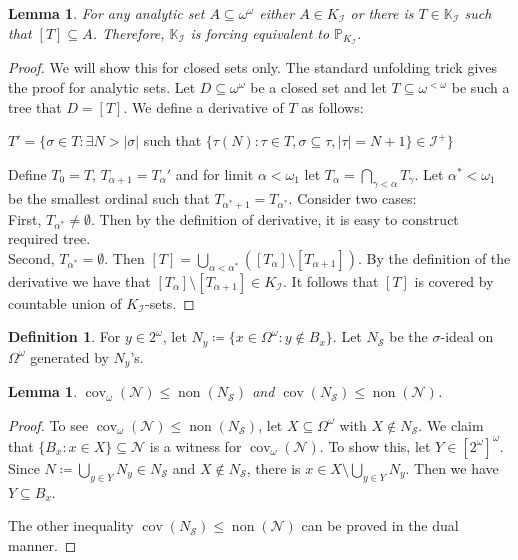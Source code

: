\documentclass[a4paper,12pt]{amsart}
\newtheorem{lem}[thm]{Lemma}
\theoremstyle{definition}
\newtheorem{dfn}[thm]{Definition}
\numberwithin{thm}{section}
\numberwithin{equation}{section}
\newcommand{\n}{\mathcal{N}}
\DeclareMathOperator{\non}{non}
\DeclareMathOperator{\cov}{cov}
\newcommand{\nonn}{\non(\mathcal{N})}
\newcommand{\I}{\mathscr{I}}
\newcommand{\covomn}{\operatorname{cov}_\omega(\mathcal{N})}
\newcommand{\Solecki}{\mathcal{S}}
\begin{document}
    \begin{lem}
        For any analytic set $A\subseteq\omega^{\omega}$ either $A\in K_{\mathscr{I}}$ or there is $T\in\mathbb{K}_{\I}$ such that $[T]\subseteq A$. Therefore, $\mathbb{K}_\I$ is forcing equivalent to $\mathbb{P}_{K_\I}$.
    \end{lem}
    \begin{proof}
        We will show this for closed sets only. The standard unfolding trick gives the proof for analytic sets. Let $D\subseteq\omega^{\omega}$ be a closed set and let $T\subseteq\omega^{<\omega}$ be such a tree that $D=[T]$. We define a derivative of $T$ as follows:
        \begin{center}
            $T'=\{\sigma\in T:\exists N>|\sigma|$ such that $\{\tau(N):\tau\in T, \sigma\subseteq\tau, |\tau|=N+1\}\in\I^{+}\}$
        \end{center}
        Define $T_{0}=T$, $T_{\alpha+1}=T_{\alpha}'$ and for limit $\alpha<\omega_{1}$ let $T_{\alpha}=\bigcap_{\gamma<\alpha}T_{\gamma}$. Let $\alpha^{*}<\omega_{1}$ be the smallest ordinal such that $T_{\alpha^{*}+1}=T_{\alpha^{*}}$. Consider two cases:\\
        First, $T_{\alpha^{*}}\neq\emptyset$. Then by the definition of derivative, it is easy to construct required tree.\\
        Second, $T_{\alpha^{*}}=\emptyset$. Then $[T]=\bigcup_{\alpha<\alpha^{*}}([T_{\alpha}]\setminus[T_{\alpha+1}])$. By the definition of the derivative we have that $[T_{\alpha}]\setminus[T_{\alpha+1}]\in K_{\mathscr{I}}$. It follows that $[T]$ is covered by countable union of $K_{\mathscr{I}}$-sets. 
    \end{proof}

    \begin{dfn}
        For $y\in2^\omega$, let $N_y\coloneqq\{x\in\Omega^\omega:y\notin B_x\}$. 
        Let $N_\Solecki$ be the $\sigma$-ideal on $\Omega^\omega$ generated by $N_y$'s.
    \end{dfn}
    
    \begin{lem}
        $\covomn\leq\non(N_\Solecki)$ and $\cov(N_\Solecki)\leq\nonn$.
    \end{lem}
    \begin{proof}
        To see $\covomn\leq\non(N_\Solecki)$, let $X\subseteq\Omega^\omega$ with $X\notin N_\Solecki$. We claim that $\{B_x:x\in X\}\subseteq\n$ is a witness for $\covomn$. To show this, let $Y\in[2^\omega]^\omega$. Since $N\coloneqq\bigcup_{y\in Y}N_y\in N_\Solecki$ and $X\notin N_\Solecki$, there is $x\in X\setminus\bigcup_{y\in Y}N_y$. Then we have $Y\subseteq B_x$.
        
        The other inequality $\cov(N_\Solecki)\leq\nonn$ can be proved in the dual manner.
    \end{proof}
\end{document}

